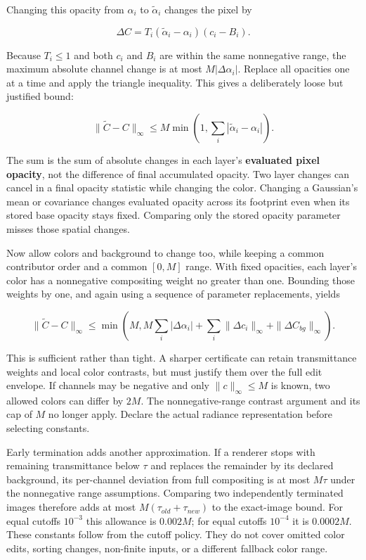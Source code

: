Changing this opacity from \(\alpha_i\) to \(\widetilde\alpha_i\) changes the pixel by

\[
\Delta C=T_i(\widetilde\alpha_i-\alpha_i)(c_i-B_i).
\]

Because \(T_i\le1\) and both \(c_i\) and \(B_i\) are within the same nonnegative range, the maximum absolute channel change is at most \(M|\Delta\alpha_i|\). Replace all opacities one at a time and apply the triangle inequality. This gives a deliberately loose but justified bound:

\[
\|\widetilde C-C\|_\infty
\le M\min\left(1,\sum_i|\widetilde\alpha_i-\alpha_i|\right).
\]

The sum is the sum of absolute changes in each layer's \textbf{evaluated pixel opacity}, not the difference of final accumulated opacity. Two layer changes can cancel in a final opacity statistic while changing the color. Changing a Gaussian's mean or covariance changes evaluated opacity across its footprint even when its stored base opacity stays fixed. Comparing only the stored opacity parameter misses those spatial changes.

Now allow colors and background to change too, while keeping a common contributor order and a common \([0,M]\) range. With fixed opacities, each layer's color has a nonnegative compositing weight no greater than one. Bounding those weights by one, and again using a sequence of parameter replacements, yields

\[
\|\widetilde C-C\|_\infty
\le\min\left(
 M,
 M\sum_i|\Delta\alpha_i|
 +\sum_i\|\Delta c_i\|_\infty
 +\|\Delta C_{bg}\|_\infty
\right).
\]

This is sufficient rather than tight. A sharper certificate can retain transmittance weights and local color contrasts, but must justify them over the full edit envelope. If channels may be negative and only \(\|c\|_\infty\le M\) is known, two allowed colors can differ by \(2M\). The nonnegative-range contrast argument and its cap of \(M\) no longer apply. Declare the actual radiance representation before selecting constants.

Early termination adds another approximation. If a renderer stops with remaining transmittance below \(\tau\) and replaces the remainder by its declared background, its per-channel deviation from full compositing is at most \(M\tau\) under the nonnegative range assumptions. Comparing two independently terminated images therefore adds at most \(M(\tau_{old}+\tau_{new})\) to the exact-image bound. For equal cutoffs \(10^{-3}\) this allowance is \(0.002M\); for equal cutoffs \(10^{-4}\) it is \(0.0002M\). These constants follow from the cutoff policy. They do not cover omitted color edits, sorting changes, non-finite inputs, or a different fallback color range.

